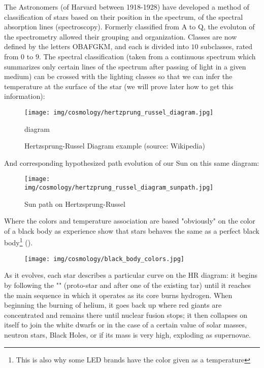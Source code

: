 	The Astronomers (of Harvard between 1918-1928) have developed a method of classification of stars based on their position in the spectrum, of the spectral absorption lines (spectroscopy). Formerly classified from A to Q, the evoluton of the spectrometry allowed their grouping and organization. Classes are now defined by the letters OBAFGKM, and each is divided into $10$ subclasses, rated from $0$ to $9$. The spectral classification (taken from a continuous spectrum which summarizes only certain lines of the spectrum after passing of light in a given medium) can be crossed with the lighting classes so that we can infer the temperature at the surface of the star (we will prove later how to get this information)\label{hertzsprung russell diagram}:
	\begin{figure}[H]
		\begin{center}
		\texttt{[image: img/cosmology/hertzprung\_russel\_diagram.jpg]}
		\end{center} diagram	
		\caption[Hertzsprung-Russel Diagram example]{Hertzsprung-Russel Diagram example (source: Wikipedia)}
	\end{figure}
	And corresponding hypothesized path evolution of our Sun on this same diagram:
	\begin{figure}[H]
		\begin{center}
		\texttt{[image: img/cosmology/hertzprung\_russel\_diagram\_sunpath.jpg]}
		\end{center}	
		\caption{Sun path on Hertzsprung-Russel}
	\end{figure}
	Where the colors and temperature association are based "obviously" on the color of a black body as experience show that stars behaves the same as a perfect black body\footnote{This is also why some LED brands have the color given as a temperature} ().
	\begin{figure}[H]
		\centering
		\texttt{[image: img/cosmology/black\_body\_colors.jpg]}
	\end{figure}

	As it evolves, each star describes a particular curve on the HR diagram: it begins by following the "" (proto-star and after one of the existing tar) until it reaches the main sequence in which it operates as its core burns hydrogen. When beginning the burning of helium, it goes back up where red giants are concentrated and remains there until nuclear fusion stops; it then collapses on itself to join the white dwarfs or in the case of a certain value of solar masses, neutron stars, Black Holes, or if its mass is very high, exploding as supernovae.
	
